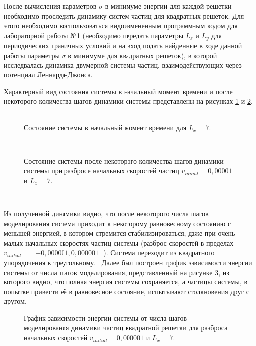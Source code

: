 \documentclass[14pt,a4paper,report]{ncc}
\begin{document}
После вычисления параметров $\sigma$ в минимуме энергии для каждой решетки необходимо проследить динамику систем частиц для квадратных решеток. Для этого необходимо воспользоваться видоизмененным программным кодом для лабораторной работы №1 (необходимо передать параметры $L_x$ и $L_y$ для периодических граничных условий и на вход подать найденные в ходе данной работы параметры $\sigma$ в минимуме для квадратных решеток), в которой исследвалась динамика двумерной системы частиц, взаимодействующих через потенциал Леннарда-Джонса.
\

Характерный вид состояния системы в начальный момент времени и после некоторого количества шагов динамики системы представлены на рисунках \ref{ris:image6} и \ref{ris:image7}. 
\
\begin{figure}[p]
\caption{Состояние системы в начальный момент времени для $L_x=7$.}
\label{ris:image6}
\end{figure}
\

\begin{figure}[p]
\caption{Состояние системы после некоторого количества шагов динамики системы при разбросе начальных скоростей частиц $v_{initial} = 0,00001 $ и  $L_x=7$.}
\label{ris:image7}
\end{figure}
\

Из полученной динамики видно, что после некоторого числа шагов моделирования система приходит к некоторому равновесному состоянию с меньшей энергией, в котором стремится стабилизироваться, даже при очень малых начальных скоростях частиц системы (разброс скоростей в пределах $v_{initial} = [-0,000001, 0,000001] $). Система переходит из квадратного упорядочения к треугольному.
\
Далее был построен график зависимости энергии системы от числа шагов моделирования, представленный на рисунке \ref{ris:image8}, из которого видно, что полная энергия системы сохраняется, а частицы системы, в попытке привести её в равновесное состояние, испытывают столкновения друг с другом.
\

\begin{figure}[h!]
\caption{График зависимости энергии системы от числа шагов моделирования динамики частиц квадратной решетки для разброса начальных скоростей $v_{initial} = 0,000001 $ и  $L_x=7$.}
\label{ris:image8}
\end{figure}
\
\end{document}
